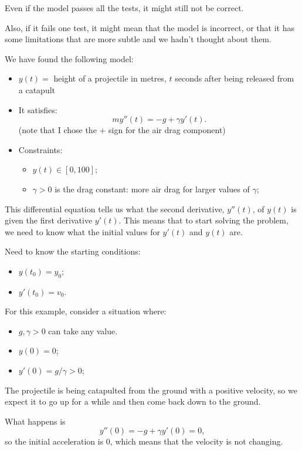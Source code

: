 \begin{important}
Even if the model passes all the tests, it might still not be correct.

Also, if it fails one test, it might mean that the model is incorrect, or that it has some limitations that are more subtle and we hadn't thought about them.	
\end{important}

\begin{example}
We have found the following model:
\begin{itemize}
	\item $y(t) = $ height of a projectile in metres, $t$ seconds after being released from a catapult
	\item It satisfies:
		$$m y''(t) =  -g + \gamma y'(t).$$
	(note that I chose the $+$ sign for the air drag component)

	\item Constraints:
	\begin{itemize}
		\item $y(t) \in [0,100]$;
		\item $\gamma >0$ is the drag constant: more air drag for larger values of $\gamma$;
	\end{itemize}
\end{itemize}	

This differential equation tells us what the second derivative, $y''(t)$, of $y(t)$ is given the first derivative $y'(t)$.
This means that to start solving the problem, we need to know what the initial values for $y'(t)$ and $y(t)$ are.

Need to know the starting conditions:
\begin{itemize}
	\item $y(t_0) = y_0$;
	\item $y'(t_0) = v_0$.
\end{itemize}

For this example, consider a situation where:
\begin{itemize}
	\item $g, \gamma >0$ can take any value.
	\item $y(0) = 0$;
	\item $y'(0) = g/\gamma > 0$;
\end{itemize}

The projectile is being catapulted from the ground with a positive velocity, so we expect it to go up for a while and then come back down to the ground.

What happens is 
$$
y''(0) = -g + \gamma y'(0) = 0,
$$
so the initial acceleration is 0, which means that the velocity is not changing.


\end{example}
